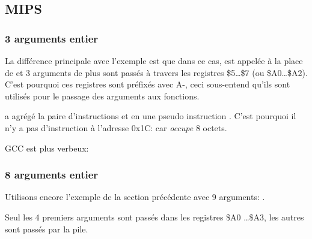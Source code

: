 \subsection{MIPS}

\subsubsection{3 arguments entier}


La différence principale avec l'exemple \q{\HelloWorldSectionName} est que dans ce cas, \printf est appelée
à la place de \puts et 3 arguments de plus sont passés à travers les registres \$5\dots \$7 (ou \$A0\dots \$A2).
C'est pourquoi ces registres sont préfixés avec A-, ceci sous-entend qu'ils
sont utilisés pour le passage des arguments aux fonctions.





\IDA a agrégé la paire d'instructions  et  en une pseudo instruction .
C'est pourquoi il n'y a pas d'instruction à l'adresse 0x1C: car  \emph{occupe} 8 octets.


GCC \NonOptimizing est plus verbeux:





\subsubsection{8 arguments entier}

Utilisons encore l'exemple de la section précédente avec 9 arguments: .




Seul les 4 premiers arguments sont passés dans les registres \$A0 \dots \$A3,
les autres sont passés par la pile.

